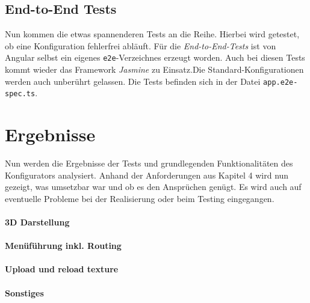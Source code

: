 \subsection{End-to-End Tests}
%
Nun kommen die etwas spannenderen Tests an die Reihe. Hierbei wird getestet, ob eine Konfiguration fehlerfrei abläuft. Für die \textit{End-to-End-Tests} ist von Angular selbst ein eigenes \texttt{e2e}-Verzeichnes erzeugt worden. Auch bei diesen Tests kommt wieder das Framework \textit{Jasmine} zu Einsatz.Die Standard-Konfigurationen werden auch unberührt gelassen. Die Tests befinden sich in der Datei \texttt{app.e2e-spec.ts}.

\section{Ergebnisse}
Nun werden die Ergebnisse der Tests und grundlegenden Funktionalitäten des Konfigurators analysiert. Anhand der Anforderungen aus Kapitel 4 wird nun gezeigt, was umsetzbar war und ob es den Ansprüchen genügt. Es wird auch auf eventuelle Probleme bei der Realisierung oder beim Testing eingegangen.
\paragraph{3D Darstellung}
\paragraph{Menüführung inkl. Routing}
\paragraph{Upload und reload texture}
\paragraph{Sonstiges}